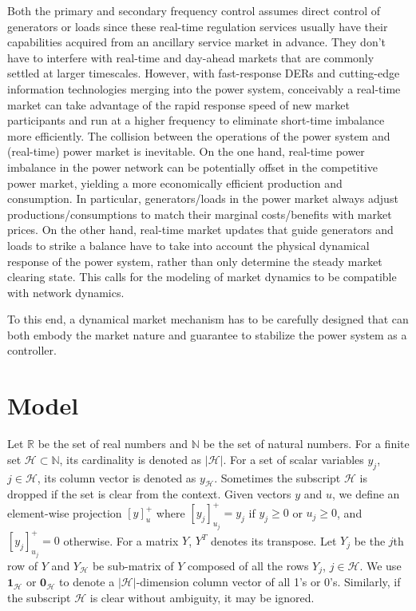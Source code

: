 \documentclass[journal,12pt,onecolumn,draftclsnofoot]{IEEEtran}
\begin{document}
Both the primary and secondary frequency control assumes direct control of generators or loads since these real-time regulation services usually have their capabilities acquired from an ancillary service market in advance. They don't have to interfere with real-time and day-ahead markets that are commonly settled at larger timescales. However, with fast-response DERs and cutting-edge information technologies merging into the power system, conceivably a real-time market can take advantage of the rapid response speed of new market participants and run at a higher frequency to eliminate short-time imbalance more efficiently. The collision between the operations of the power system and (real-time) power market is inevitable. On the one hand, real-time power imbalance in the power network can be potentially offset in the competitive power market, yielding a more economically efficient production and consumption. In particular, generators/loads in the power market always adjust productions/consumptions to match their marginal costs/benefits with market prices. On the other hand, real-time market updates that guide generators and loads to strike a balance have to take into account the physical dynamical response of the power system, rather than only determine the steady market clearing state. This calls for the modeling of market dynamics to be compatible with network dynamics.

To this end, a dynamical market mechanism has to be carefully designed that can both embody the market nature and guarantee to stabilize the power system as a controller.

     



   

\section{Model}

Let $\mathbb{R}$ be the set of real numbers and $\mathbb{N}$ be the set of natural numbers. For a finite set $\mathcal{H} \subset \mathbb{N}$, its cardinality is denoted as $|\mathcal{H}|$. For a set of scalar variables $y_j$, $j\in\mathcal{H}$, its column vector is denoted as $y_{\mathcal{H}}$. Sometimes the subscript $\mathcal{H}$ is dropped if the set is clear from the context. Given vectors $y$ and $u$, we define an element-wise projection $[y]^+_{u}$ where $[y_j]^+_{u_j}=y_j$ if $y_j\ge 0$ or $u_j\ge 0$, and $[y_j]^+_{u_j}=0$ otherwise. 
For a matrix $Y$, $Y^T$ denotes its transpose. Let $Y_j$ be the $j$th row of $Y$ and $Y_\mathcal{H}$ be sub-matrix of $Y$ composed of all the rows $Y_j$, $j\in\mathcal{H}$. We use $\mathbf{1}_\mathcal{H}$ or $\mathbf{0}_{\mathcal{H}}$ to denote a $|\mathcal{H}|$-dimension column vector of all 1's or 0's. Similarly, if the subscript $\mathcal{H}$ is clear without ambiguity, it may be ignored. 
\end{document}

